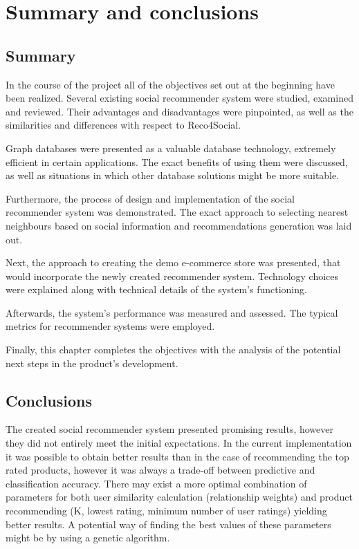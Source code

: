 \documentclass[12pt]{report}
\begin{document}



\chapter{Summary and conclusions}
\label{ch.summary}
\section{Summary}

In the course of the project all of the objectives set out at the beginning have been realized. Several existing social recommender system were studied, examined and reviewed. Their advantages and disadvantages were pinpointed, as well as the similarities and differences with respect to Reco4Social.

Graph databases were presented as a valuable database technology, extremely efficient in certain applications. The exact benefits of using them were discussed, as well as situations in which other database solutions might be more suitable.

Furthermore, the process of design and implementation of the social recommender system was demonstrated. The exact approach to selecting nearest neighbours based on social information and recommendations generation was laid out.

Next, the approach to creating the demo e-commerce store was presented, that would incorporate the newly created recommender system. Technology choices were explained along with technical details of the system's functioning.

Afterwards, the system's performance was measured and assessed. The typical metrics for recommender systems were employed.

Finally, this chapter completes the objectives with the analysis of the potential next steps in the product's development.

\section{Conclusions}

The created social recommender system presented promising results, however they did not entirely meet the initial expectations. In the current implementation it was possible to obtain better results than in the case of recommending the top rated products, however it was always a trade-off between predictive and classification accuracy. There may exist a more optimal combination of parameters for both user similarity calculation (relationship weights) and product recommending (K, lowest rating, minimum number of user ratings) yielding better results. A potential way of finding the best values of these parameters might be by using a genetic algorithm.
\end{document}
